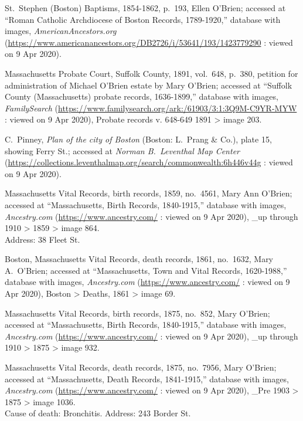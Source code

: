 \begin{thebibliography}{999}
	St.\ Stephen (Boston) Baptisms, 1854-1862, p.\ 193, Ellen O'Brien; accessed at ``Roman Catholic Archdiocese of Boston Records, 1789-1920,'' database with images, \textit{AmericanAncestors.org} (\url{https://www.americanancestors.org/DB2726/i/53641/193/1423779290} : viewed on 9 Apr 2020).
	
	Massachusetts Probate Court, Suffolk County, 1891, vol.\ 648, p.\ 380, petition for administration of Michael O'Brien estate by Mary O'Brien; accessed at ``Suffolk County (Massachusetts) probate records, 1636-1899,'' database with images, \textit{FamilySearch} (\url{https://www.familysearch.org/ark:/61903/3:1:3Q9M-C9YR-MYW} : viewed on 9 Apr 2020), Probate records v. 648-649 1891 > image 203.
	
	C.\ Pinney, \textit{Plan of the city of Boston} (Boston: L.\ Prang \& Co.), plate 15, showing Ferry St.; accessed at \textit{Norman B.\ Leventhal Map Center} (\url{https://collections.leventhalmap.org/search/commonwealth:6h446v44g} : viewed on 9 Apr 2020).	
	
	Massachusetts Vital Records, birth records, 1859, no.\ 4561, Mary Ann O'Brien; accessed at ``Massachusetts, Birth Records, 1840-1915,'' database with images, \textit{Ancestry.com} (\url{https://www.ancestry.com/} : viewed on 9 Apr 2020), \_up through 1910 > 1859 > image 864.\\
	Address: 38 Fleet St.
	
	Boston, Massachusetts Vital Records, death records, 1861, no.\ 1632, Mary A.\ O'Brien; accessed at ``Massachusetts, Town and Vital Records, 1620-1988,'' database with images, \textit{Ancestry.com} (\url{https://www.ancestry.com/} : viewed on 9 Apr 2020), Boston > Deaths, 1861 > image 69.
	
	Massachusetts Vital Records, birth records, 1875, no.\ 852, Mary O'Brien; accessed at ``Massachusetts, Birth Records, 1840-1915,'' database with images, \textit{Ancestry.com} (\url{https://www.ancestry.com/} : viewed on 9 Apr 2020), \_up through 1910 > 1875 > image 932.
	
	Massachusetts Vital Records, death records, 1875, no.\ 7956, Mary O'Brien; accessed at ``Massachusetts, Death Records, 1841-1915,'' database with images, \textit{Ancestry.com} (\url{https://www.ancestry.com/} : viewed on 9 Apr 2020), \_Pre 1903 > 1875 > image 1036.\\
	Cause of death: Bronchitis. Address: 243 Border St.
	

\end{thebibliography}
